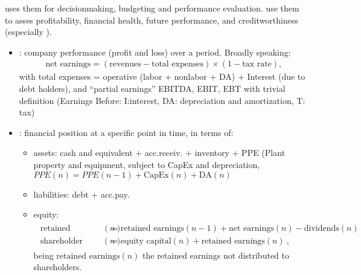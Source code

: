 \documentclass[letterpaper,10pt,english]{jupyterBook}
\begin{document}
\sphinxAtStartPar
{}  uses them for decision\sphinxhyphen{}making, budgeting and performance evaluation.  use them to asses profitability, financial health, future performance, and creditworthiness (especially ).
\begin{itemize}
\item {} 
\sphinxAtStartPar
{}: company performance (profit and loss) over a period. Broadly speaking:
\begin{equation*}
\begin{split}\text{net earnings} = ( \text{revenues} - \text{total expenses} ) \times ( 1 - \text{tax rate} ) , \end{split}
\end{equation*}
\sphinxAtStartPar
with total expenses = operative (labor + non\sphinxhyphen{}labor + DA) + Interest (due to debt holders), and “partial earnings” EBITDA, EBIT, EBT with trivial definition (Earnings Before: I:interest, DA: depreciation and amortization, T: tax)

\item {} 
\sphinxAtStartPar
{}: financial position at a specific point in time, in terms of:
\begin{itemize}
\item {} 
\sphinxAtStartPar
assets: cash and equivalent + acc.receiv. + inventory + PPE (Plant property and equipment, subject to CapEx and depreciation, \(PPE(n) = PPE(n-1) + \text{CapEx}(n) + \text{DA}(n)\)

\item {} 
\sphinxAtStartPar
liabilities: debt + acc.pay.

\item {} 
\sphinxAtStartPar
equity:
\begin{equation*}
\begin{split}\begin{aligned}
       \text{retained earnings}(n) & = \text{retained earnings}(n-1) + \text{net earnings}(n) - \text{dividends}(n) \\
       \text{shareholder equity}(n) & = \text{equity capital}(n) + \text{retained earnings}(n) \ ,
     \end{aligned}\end{split}
\end{equation*}
\sphinxAtStartPar
being \(\text{retained earnings}(n)\) the  retained earnings not distributed to shareholders.


\end{itemize}
\end{itemize}
\end{document}
